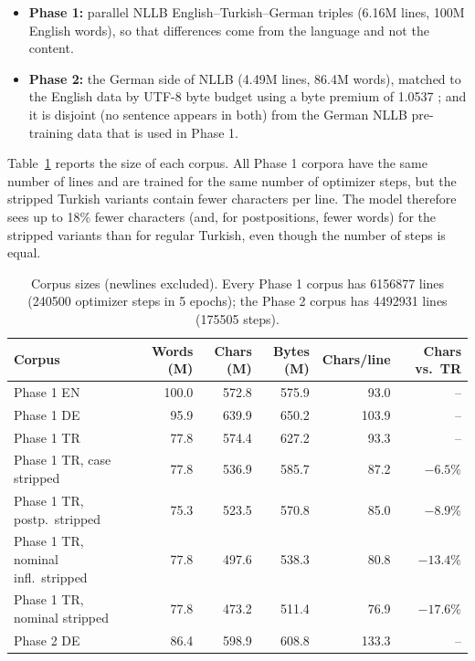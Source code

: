\documentclass[11pt]{article}
\begin{document}
\begin{itemize}
    \item \textbf{Phase 1:} parallel NLLB English--Turkish--German triples (6.16M lines, 100M English words), so that differences come from the language and not the content.
    \item \textbf{Phase 2:} the German side of NLLB (4.49M lines, 86.4M words), matched to the English data by UTF-8 byte budget using a byte premium of 1.0537 \citep{arnett2024bitproblemmeasurementdisparities}; and it is disjoint (no sentence appears in both) from the German NLLB pre-training data that is used in Phase 1.
\end{itemize}

Table~\ref{tab:budget} reports the size of each corpus. All Phase 1 corpora have the same number of lines and are trained for the same number of optimizer steps, but the stripped Turkish variants contain fewer characters per line. The model therefore sees up to 18\% fewer characters (and, for postpositions, fewer words) for the stripped variants than for regular Turkish, even though the number of steps is equal.

\begin{table}[t]
\centering\small
\begin{tabular}{lrrrrr}
\hline
Corpus & Words (M) & Chars (M) & Bytes (M) & Chars/line & Chars vs.\ TR \\
\hline
Phase 1 EN & 100.0 & 572.8 & 575.9 & 93.0 & -- \\
Phase 1 DE & 95.9 & 639.9 & 650.2 & 103.9 & -- \\
Phase 1 TR & 77.8 & 574.4 & 627.2 & 93.3 & -- \\
Phase 1 TR, case stripped & 77.8 & 536.9 & 585.7 & 87.2 & $-6.5\%$ \\
Phase 1 TR, postp.\ stripped & 75.3 & 523.5 & 570.8 & 85.0 & $-8.9\%$ \\
Phase 1 TR, nominal infl.\ stripped & 77.8 & 497.6 & 538.3 & 80.8 & $-13.4\%$ \\
Phase 1 TR, nominal stripped & 77.8 & 473.2 & 511.4 & 76.9 & $-17.6\%$ \\
\hline
Phase 2 DE & 86.4 & 598.9 & 608.8 & 133.3 & -- \\
\hline
\end{tabular}
\caption{Corpus sizes (newlines excluded). Every Phase 1 corpus has \num{6156877} lines (\num{240500} optimizer steps in 5 epochs); the Phase 2 corpus has \num{4492931} lines (\num{175505} steps).}
\label{tab:budget}
\end{table}
\end{document}
